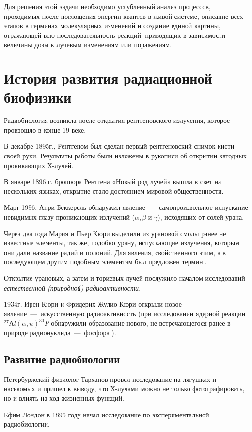 \documentclass[a4paper, 14pt]{article}
\renewcommand{\emph}[1]{{\color{orange}{\textit{\textbf{#1}}}}}
\begin{document}
Для решения этой задачи необходимо углубленный анализ процессов,
проходимых после поглощения энергии квантов в живой системе, описание всех
этапов в терминах молекулярных изменений и создание единой картины, отражающей
всю последовательность реакций, приводящих в зависимости величины дозы к
лучевым изменениям или поражениям.

\section{История развития радиационной биофизики}
Радиобиология возникла после открытия рентгеновского излучения, которое
произошло в конце 19 веке.

В декабре 1895г., Рентгеном был сделан первый рентгеновский снимок кисти своей руки. Результаты работы были изложены в рукописи об открытии катодных проникающих Х-лучей.

В январе 1896 г. брошюра Рентгена «Новый род лучей» вышла в свет на
нескольких языках, открытие стало достоянием мировой общественности.

Март 1996, Анри Беккерель обнаружил явление~---~самопроизвольное испускание
невидимых глазу проникающих излучений ($\alpha, \beta$ и $\gamma$), исходящих от солей урана.

Через два года Мария и Пьер Кюри выделили из урановой смолы ранее не
известные элементы, так же, подобно урану, испускающие излучения, которым они
дали название радий и полоний. Для явления, свойственного этим, а в последующем
другим подобным элементам был предложен термин \emph{радиоактивность}.

Открытие урановых, а затем и ториевых лучей послужило началом
исследований \textit{естественной (природной) радиоактивности}.

1934г. Ирен Кюри и Фридерих Жулио Кюри открыли новое явление~---~искусственную радиоактивность (при исследовании ядерной реакции $^{27}Аl(\alpha,n)^{30}P$ %
обнаружили образование нового, не встречающегося ранее в природе радионуклида~---~фосфора ).

\subsection{Развитие радиобиологии}
Петербуржский физиолог Тарханов провел исследование на лягушках и
насекомых и пришел к выводу, что Х-лучами можно не только фотографировать, но и
влиять на ход жизненных функций.

Ефим Лондон в 1896 году начал исследование по экспериментальной
радиобиологии.
\end{document}
